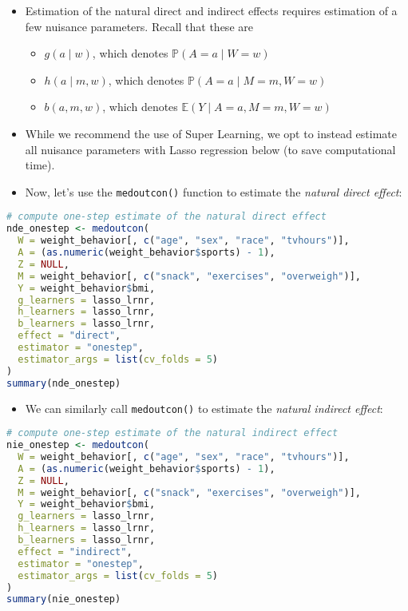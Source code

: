 \documentclass[
  12pt,
]{book}
\newcommand{\passthrough}[1]{#1}
\providecommand{\tightlist}{%
  \setlength{\itemsep}{0pt}\setlength{\parskip}{0pt}}
\theoremstyle{definition}
\theoremstyle{definition}
\theoremstyle{definition}
\renewcommand{\P}{\mathbb{P}}
\newcommand{\E}{\mathbb{E}}
\newcommand{\1}{\mathbbm{1}}
\begin{document}
\begin{itemize}
\tightlist
\item
  Estimation of the natural direct and indirect effects requires estimation of a
  few nuisance parameters. Recall that these are

  \begin{itemize}
  \tightlist
  \item
    \(g(a\mid w)\), which denotes \(\P(A=a \mid W=w)\)
  \item
    \(h(a\mid m, w)\), which denotes \(\P(A=a \mid M=m, W=w)\)
  \item
    \(b(a, m, w)\), which denotes \(\E(Y \mid A=a, M=m, W=w)\)
  \end{itemize}
\item
  While we recommend the use of Super Learning, we opt to instead estimate all
  nuisance parameters with Lasso regression below (to save computational time).
\item
  Now, let's use the \passthrough{\lstinline!medoutcon()!} function to estimate the \emph{natural direct
  effect}:
\end{itemize}

\begin{lstlisting}[language=R]
# compute one-step estimate of the natural direct effect
nde_onestep <- medoutcon(
  W = weight_behavior[, c("age", "sex", "race", "tvhours")],
  A = (as.numeric(weight_behavior$sports) - 1),
  Z = NULL,
  M = weight_behavior[, c("snack", "exercises", "overweigh")],
  Y = weight_behavior$bmi,
  g_learners = lasso_lrnr,
  h_learners = lasso_lrnr,
  b_learners = lasso_lrnr,
  effect = "direct",
  estimator = "onestep",
  estimator_args = list(cv_folds = 5)
)
summary(nde_onestep)
\end{lstlisting}

\begin{itemize}
\tightlist
\item
  We can similarly call \passthrough{\lstinline!medoutcon()!} to estimate the \emph{natural indirect effect}:
\end{itemize}

\begin{lstlisting}[language=R]
# compute one-step estimate of the natural indirect effect
nie_onestep <- medoutcon(
  W = weight_behavior[, c("age", "sex", "race", "tvhours")],
  A = (as.numeric(weight_behavior$sports) - 1),
  Z = NULL,
  M = weight_behavior[, c("snack", "exercises", "overweigh")],
  Y = weight_behavior$bmi,
  g_learners = lasso_lrnr,
  h_learners = lasso_lrnr,
  b_learners = lasso_lrnr,
  effect = "indirect",
  estimator = "onestep",
  estimator_args = list(cv_folds = 5)
)
summary(nie_onestep)
\end{lstlisting}
\end{document}
